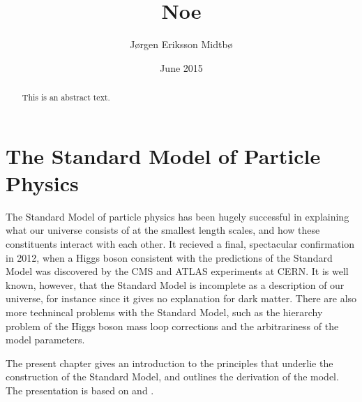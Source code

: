 \documentclass[twoside,english]{uiofysmaster}
\author{J\o rgen Eriksson Midtb\o}
\title{Noe}
\date{June 2015}
\begin{document}

\cleardoublepage

\begin{abstract}
This is an abstract text.
\end{abstract}



\tableofcontents
\listoffigures
\listoftables



\chapter{The Standard Model of Particle Physics}%
\label{ch:SM_intro}
The Standard Model of particle physics has been hugely successful in explaining what our universe consists of at the smallest length scales, and how these constituents interact with each other. It recieved a final, spectacular confirmation in 2012, when a Higgs boson consistent with the predictions of the Standard Model was discovered by the CMS and ATLAS experiments at CERN. It is well known, however, that the Standard Model is incomplete as a description of our universe, for instance since it gives no explanation for dark matter. There are also more technincal problems with the Standard Model, such as the hierarchy problem of the Higgs boson mass loop corrections and the arbitrariness of the model parameters.

The present chapter gives an introduction to the principles that underlie the construction of the Standard Model, and outlines the derivation of the model. The presentation is based on \cite{Mandl-Shaw} and \cite{Peskin-Schroeder}.
\end{document}
